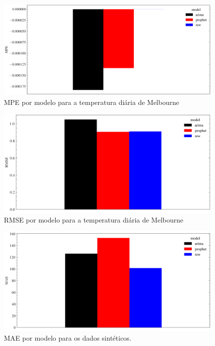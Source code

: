 \begin{figure}[!htp]
    \centering
    \includegraphics[width=5.0in]{img/temperatures_mpe_comparison.pdf}
    \caption{MPE por modelo para a temperatura diária de Melbourne}
\end{figure}

\begin{figure}[!htp]
    \centering
    \includegraphics[width=5.0in]{img/temperatures_rmse_comparison.pdf}
    \caption{RMSE por modelo para a temperatura diária de Melbourne}
\end{figure}

\begin{figure}[!htp]
    \centering
    \includegraphics[width=5.0in]{img/synthetic_mae_comparison.pdf}
    \caption{MAE por modelo para os dados sintéticos.}
\end{figure}

